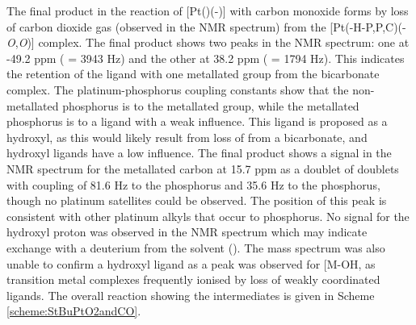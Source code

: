 The final product in the reaction of [Pt(\tButhixantphos)(-)] with carbon monoxide forms by loss of carbon dioxide gas (observed in the \carbon{} NMR spectrum) from the [Pt(\tButhixantphos-H-\dento{}P,P\textprime,C)(-\emph{O},\emph{O})] complex.  The final product shows two peaks in the \phosphorus{} NMR spectrum: one at -49.2 ppm (\JPtP{} = 3943 Hz) and the other at 38.2 ppm (\JPtP{} = 1794 Hz).  This indicates the retention of the \tButhixantphos{} ligand with one metallated \tBu{} group from the bicarbonate complex.  The platinum-phosphorus coupling constants show that the non-metallated phosphorus is \trans{} to the metallated \tBu{} group, while the metallated phosphorus is \trans{} to a ligand with a weak \trans{} influence.  This ligand is proposed as a hydroxyl, as this would likely result from loss of  from a bicarbonate, and hydroxyl ligands have a low \trans{} influence.  The final product shows a signal in the \carbon{} NMR spectrum for the metallated carbon at 15.7 ppm as a doublet of doublets with coupling of 81.6 Hz to the \trans{} phosphorus and 35.6 Hz to the \cis{} phosphorus, though no platinum satellites could be observed.  The position of this peak is consistent with other platinum alkyls that occur \trans{} to phosphorus.\cite{Zayya2012, Zayya2012b}  No signal for the hydroxyl proton was observed in the \proton{} NMR spectrum which may indicate exchange with a deuterium from the solvent ().  The mass spectrum was also unable to confirm a hydroxyl ligand as a peak was observed for [M-OH\ce{]+}, as transition metal complexes frequently ionised by loss of weakly coordinated ligands.\cite{Henderson1998}  The overall reaction showing the intermediates is given in Scheme \ref{scheme:StBuPtO2andCO}.

